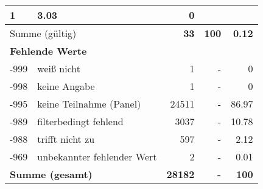 \begin{longtable}{lXrrr}
       \num{1} &
       \num[round-mode=places,round-precision=2]{3,03} &
         \num[round-mode=places,round-precision=2]{0} \\
     \midrule
     \multicolumn{2}{l}{Summe (gültig)} &
       \textbf{\num{33}} &
     \textbf{100} &
       \textbf{\num[round-mode=places,round-precision=2]{0,12}} \\
     \multicolumn{5}{l}{\textbf{Fehlende Werte}}\\
       -999 &
       weiß nicht &
         \num{1} &
        - &
         \num[round-mode=places,round-precision=2]{0} \\
       -998 &
       keine Angabe &
         \num{1} &
        - &
         \num[round-mode=places,round-precision=2]{0} \\
       -995 &
       keine Teilnahme (Panel) &
         \num{24511} &
        - &
         \num[round-mode=places,round-precision=2]{86,97} \\
       -989 &
       filterbedingt fehlend &
         \num{3037} &
        - &
         \num[round-mode=places,round-precision=2]{10,78} \\
       -988 &
       trifft nicht zu &
         \num{597} &
        - &
         \num[round-mode=places,round-precision=2]{2,12} \\
       -969 &
       unbekannter fehlender Wert &
         \num{2} &
        - &
         \num[round-mode=places,round-precision=2]{0,01} \\
     \midrule
     \multicolumn{2}{l}{\textbf{Summe (gesamt)}} &
          \textbf{\num{28182}} &
        \textbf{-} &
        \textbf{100} \\
     \bottomrule
     \end{longtable}
     
